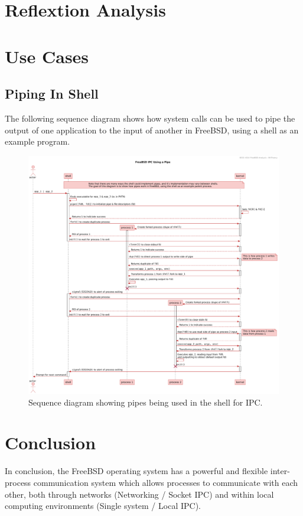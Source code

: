 \documentclass[12pt, dvipsnames, a4paper]{article}
\begin{document}
\section{Reflextion Analysis}

\clearpage
\section{Use Cases}
\subsection{Piping In Shell}
The following sequence diagram shows how system calls can be used to pipe the
output of one application to the input of another in FreeBSD, using a shell
as an example program.
\begin{figure}[!htb]
	\advance\leftskip-0.5cm
	\includegraphics[width = 570pt]{assets/use_case_diagrams/pipe.pdf}
	\caption{Sequence diagram showing pipes being used in the shell for IPC. \cite{pipe}\cite{fork}\cite{wait}\cite{close}\cite{dup}\cite{execve}\cite{signal}\cite{pipe-explained}}
\end{figure}

\clearpage
\section{Conclusion}
In conclusion, the FreeBSD operating system has a powerful and flexible inter-process communication system which allows processes to communicate with each other, both through networks (Networking / Socket IPC) and within local computing environments (Single system / Local IPC).
\end{document}
